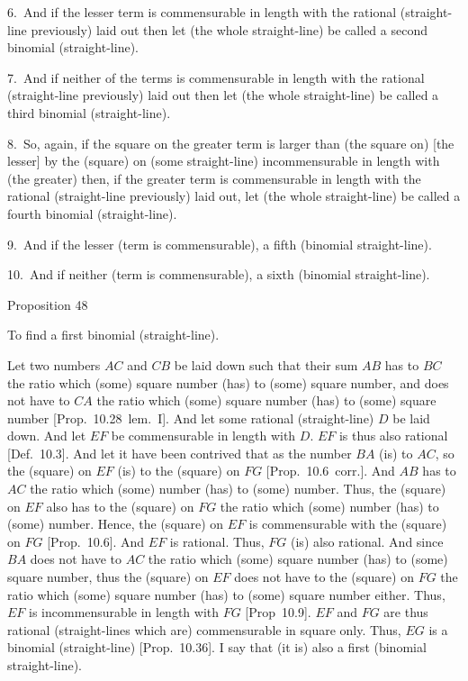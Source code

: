 6.~And if the lesser term is commensurable in length with the  rational (straight-line previously) laid
out then let (the whole straight-line) be called a
second binomial (straight-line).

7.~And if neither of the terms is commensurable in length with the 
rational (straight-line previously) laid out then let (the whole straight-line) be called a third
binomial (straight-line).

8.~So, again, if the square on the greater term is larger than (the
square on) [the lesser] by the (square) on (some straight-line)
incommensurable in length with (the greater) then, if the
greater term is commensurable in length with the  rational
(straight-line previously) laid out, let (the whole straight-line) be called a fourth
binomial (straight-line).

9.~And if the lesser (term is commensurable), a fifth (binomial straight-line).

10.~And if neither (term is commensurable), a sixth (binomial straight-line).


\begin{center}
{\large Proposition 48}
\end{center}

To find a first binomial (straight-line).

Let  two numbers $AC$ and $CB$ be laid down such that their sum
$AB$ has to $BC$ the ratio  which (some) square number (has) to (some)
square number, and does not have to $CA$ the ratio which (some)
square number (has) to (some) square number [Prop.~10.28~lem.~I]. And let some rational (straight-line) $D$ be laid down. And let $EF$ be commensurable in length with $D$. $EF$ is thus also rational [Def.~10.3]. 
And let it have been contrived that as the number $BA$ (is) to $AC$, so the
(square) on $EF$ (is) to the (square) on $FG$ [Prop.~10.6~corr.]. And $AB$ has to $AC$ the ratio
which (some) number (has) to (some) number. Thus, the (square) on $EF$
also has to the (square) on $FG$ the ratio which (some) number
(has) to (some) number. Hence, the (square) on $EF$ is commensurable
with the (square) on $FG$ [Prop.~10.6].  And
$EF$ is rational. Thus, $FG$ (is) also rational. And since $BA$ does not
have to $AC$ the ratio which (some) square number (has) to (some)
square number, thus the (square) on $EF$ does not have to the (square)
on $FG$ the ratio which (some) square number (has) to (some) square number either. Thus, $EF$ is incommensurable in length with $FG$ [Prop~10.9]. $EF$ and $FG$ are thus rational
(straight-lines which are) commensurable in square only. Thus, $EG$
is a binomial (straight-line) [Prop.~10.36].
I say that (it is) also a first (binomial straight-line).

